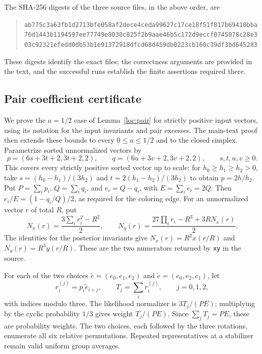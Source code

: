 The SHA-256 digests of the three source files, in the above order, are
\begin{quote}\small\ttfamily
\nolinkurl{ab775c3a63fb1d2713bfe058af2dece4ceda99627c17ce18f51f817b69410bba}\\
\nolinkurl{76d1443b1194597ee77749e8030c825f2b9aae46b5c172d9eccf0745078c28e3}\\
\nolinkurl{03c92321efedd0db53b1e91372918dfcd68d459db0223cb160c39df3bd645283}
\end{quote}
These digests identify the exact files; the correctness arguments are
provided in the text, and the successful runs establish the finite
assertions required there.

\subsection{Pair coefficient certificate}\label{cert:pair}
We prove the $a=1/2$ case of Lemma~\ref{loc:pair} for strictly
positive input vectors, using its notation for the input invariants and
pair excesses.  The main-text proof then extends these bounds to every
$0\le a\le1/2$ and to the closed simplex.
Parametrize sorted unnormalized vectors by
\[
 p=(6s+3t+2,3t+2,2),\qquad
 q=(6u+3v+2,3v+2,2),\qquad s,t,u,v\ge0.
\]
This covers every strictly positive sorted vector up to scale: for
$h_0\ge h_1\ge h_2>0$, take
$s=(h_0-h_1)/(3h_2)$ and $t=2(h_1-h_2)/(3h_2)$ to obtain
$p=2h/h_2$.  Put $P=\sum_i p_i$, $Q=\sum_i q_i$, and
$e_i=Q-q_i$, with $E=\sum_i e_i=2Q$.  Then
$e_i/E=(1-q_i/Q)/2$, as required for the coloring edge.
For an unnormalized vector $r$ of total $R$, put
\[
 N_x(r)=\frac{3\sum_i r_i^2-R^2}{2},\qquad
 N_y(r)=\frac{27\prod_i r_i-R^3+3R N_x(r)}2.
\]
The identities for the posterior invariants give
$N_x(r)=R^2x(r/R)$ and $N_y(r)=R^3y(r/R)$.
These are the two numerators returned by \texttt{xy} in the source.

For each of the two choices
$\widetilde e=(e_0,e_1,e_2)$ and $\widetilde e=(e_0,e_2,e_1)$,
let
\[
 r_i^{(j)}=p_i\widetilde e_{i+j},\qquad
 T_j=\sum_i r_i^{(j)},\qquad j=0,1,2,
\]
with indices modulo three.  The likelihood normalizer is
$3T_j/(PE)$; multiplying by the cyclic probability $1/3$ gives weight
$T_j/(PE)$.  Since $\sum_jT_j=PE$, these are probability weights.
The two choices, each followed by the three rotations, enumerate all
six relative permutations.  Repeated representatives at a stabilizer
remain valid uniform group averages.

